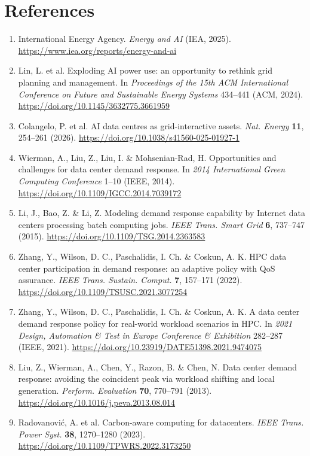 \documentclass[10pt,a4paper]{article}
\begin{document}
\section*{References}
{\small
\begin{enumerate}[label=\arabic*.,leftmargin=*,itemsep=2.5pt]
\item International Energy Agency. \emph{Energy and AI} (IEA, 2025). \url{https://www.iea.org/reports/energy-and-ai}
\item Lin, L. et al. Exploding AI power use: an opportunity to rethink grid planning and management. In \emph{Proceedings of the 15th ACM International Conference on Future and Sustainable Energy Systems} 434–441 (ACM, 2024). \url{https://doi.org/10.1145/3632775.3661959}
\item Colangelo, P. et al. AI data centres as grid-interactive assets. \emph{Nat. Energy} \textbf{11}, 254–261 (2026). \url{https://doi.org/10.1038/s41560-025-01927-1}
\item Wierman, A., Liu, Z., Liu, I. \& Mohsenian-Rad, H. Opportunities and challenges for data center demand response. In \emph{2014 International Green Computing Conference} 1–10 (IEEE, 2014). \url{https://doi.org/10.1109/IGCC.2014.7039172}
\item Li, J., Bao, Z. \& Li, Z. Modeling demand response capability by Internet data centers processing batch computing jobs. \emph{IEEE Trans. Smart Grid} \textbf{6}, 737–747 (2015). \url{https://doi.org/10.1109/TSG.2014.2363583}
\item Zhang, Y., Wilson, D. C., Paschalidis, I. Ch. \& Coskun, A. K. HPC data center participation in demand response: an adaptive policy with QoS assurance. \emph{IEEE Trans. Sustain. Comput.} \textbf{7}, 157–171 (2022). \url{https://doi.org/10.1109/TSUSC.2021.3077254}
\item Zhang, Y., Wilson, D. C., Paschalidis, I. Ch. \& Coskun, A. K. A data center demand response policy for real-world workload scenarios in HPC. In \emph{2021 Design, Automation \& Test in Europe Conference \& Exhibition} 282–287 (IEEE, 2021). \url{https://doi.org/10.23919/DATE51398.2021.9474075}
\item Liu, Z., Wierman, A., Chen, Y., Razon, B. \& Chen, N. Data center demand response: avoiding the coincident peak via workload shifting and local generation. \emph{Perform. Evaluation} \textbf{70}, 770–791 (2013). \url{https://doi.org/10.1016/j.peva.2013.08.014}
\item Radovanović, A. et al. Carbon-aware computing for datacenters. \emph{IEEE Trans. Power Syst.} \textbf{38}, 1270–1280 (2023). \url{https://doi.org/10.1109/TPWRS.2022.3173250}

\end{enumerate}}
\end{document}
